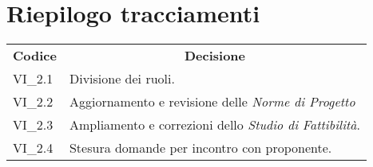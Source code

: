 
\section{Riepilogo tracciamenti}
\begin{longtable} {
		>{\centering}p{17mm} 
		>{}p{120mm}}
	\rowcolor{gray!50}
	\textbf{Codice} & \multicolumn{1}{c}{\textbf{Decisione}} \\%
	VI\_2.1 & Divisione dei ruoli. \TBstrut \\ [2mm]
	VI\_2.2 & Aggiornamento e revisione delle \textit{Norme di Progetto} \TBstrut \\ [2mm]
	VI\_2.3 & Ampliamento e correzioni dello \textit{Studio di Fattibilità}. \TBstrut \\ [2mm]
	VI\_2.4 & Stesura domande per incontro con proponente. \TBstrut \\ [2mm]
	
\end{longtable}